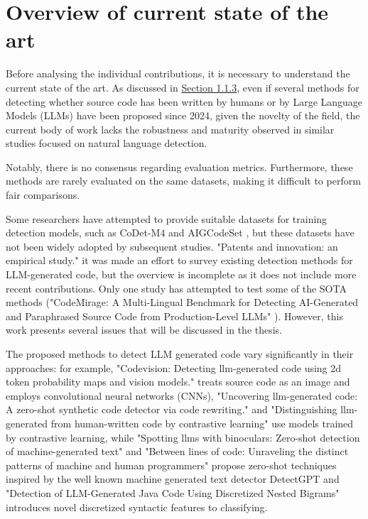 \clearpage

\chapter{Overview of current state of the art}

Before analysing the individual contributions, 
it is necessary to understand the current state 
of the art. As discussed in
\hyperref[sec:Challenges in LLM-Generated Code Detection]{Section 1.1.3}, 
even if several methods for detecting whether source code has been written 
by humans or by Large Language Models (LLMs) have been proposed since 2024, 
given the novelty of the field, the current body of work lacks the 
robustness and maturity observed in similar studies focused on natural 
language detection. 

Notably, there is no consensus regarding evaluation 
metrics. Furthermore, these methods are rarely evaluated on the same datasets, 
making it difficult to perform fair comparisons.

Some researchers have attempted to provide suitable datasets for training 
detection models, such as CoDet-M4 \cite{orel2025codet,} and 
AIGCodeSet \cite{demirok2024aigcodeset}, but 
these datasets have not been widely adopted by subsequent studies. 
"Patents and innovation: an empirical study." \cite{suh2024empirical} 
it was made an effort to survey existing detection methods for 
LLM-generated code, but the overview is incomplete as it does not include 
more recent contributions.
Only one study has attempted to test some of the SOTA methods 
("CodeMirage: A Multi-Lingual Benchmark for Detecting AI-Generated and 
Paraphrased Source Code from Production-Level LLMs" \cite{guo2025codemirage}). 
However, this work presents several issues that 
will be discussed in the thesis.

The proposed methods to detect LLM generated code
vary significantly in their approaches: for example, 
"Codevision: Detecting llm-generated code using 2d token probability 
maps and vision models."\cite{xu2025codevision} treats 
source code as an image and employs convolutional neural networks (CNNs), 
"Uncovering llm-generated code: A zero-shot synthetic code detector via code rewriting."
\cite{ye2025uncovering} and 
"Distinguishing llm-generated from human-written code by contrastive learning" 
\cite{xu2025distinguishing} use models trained by contrastive learning, 
while "Spotting llms with binoculars: Zero-shot detection of machine-generated text" 
\cite{hans2024spotting}
and "Between lines of code: Unraveling the distinct patterns of machine and human programmers" 
\cite{shi2024between} propose zero-shot techniques inspired 
by the well known machine generated text detector DetectGPT\cite{mitchell2023detectgpt} 
and "Detection of LLM-Generated Java Code Using Discretized Nested Bigrams" \cite{paek2024detection}
introduces novel 
discretized syntactic features to classifying.

